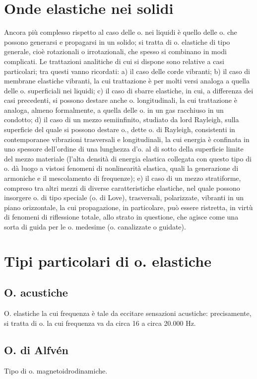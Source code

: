\documentclass[a4paper]{article}
\begin{document}
\section{Onde elastiche nei solidi}
Ancora più complesso rispetto al caso delle o. nei liquidi è quello delle o. che possono generarsi e propagarsi in un solido; si tratta di o. elastiche di tipo generale, cioè rotazionali o irrotazionali, che spesso si combinano in modi complicati. Le trattazioni analitiche di cui si dispone sono relative a casi particolari; tra questi vanno ricordati: a) il caso delle corde vibranti; b) il caso di membrane elastiche vibranti, la cui trattazione è per molti versi analoga a quella delle o. superficiali nei liquidi; c) il caso di sbarre elastiche, in cui, a differenza dei casi precedenti, si possono destare anche o. longitudinali, la cui trattazione è analoga, almeno formalmente, a quella delle o. in un gas racchiuso in un condotto; d) il caso di un mezzo semiinfinito, studiato da lord Rayleigh, sulla superficie del quale si possono destare o., dette o. di Rayleigh, consistenti in contemporanee vibrazioni trasversali e longitudinali, la cui energia è confinata in uno spessore dell’ordine di una lunghezza d’o. al di sotto della superficie limite del mezzo materiale (l’alta densità di energia elastica collegata con questo tipo di o. dà luogo a vistosi fenomeni di nonlinearità elastica, quali la generazione di armoniche e il mescolamento di frequenze); e) il caso di un mezzo stratiforme, compreso tra altri mezzi di diverse caratteristiche elastiche, nel quale possono insorgere o. di tipo speciale (o. di Love), trasversali, polarizzate, vibranti in un piano orizzontale, la cui propagazione, in particolare, può essere ristretta, in virtù di fenomeni di riflessione totale, allo strato in questione, che agisce come una sorta di guida per le o. medesime (o. canalizzate o guidate). 

\section{Tipi particolari di o. elastiche}

\subsection{O. acustiche}
O. elastiche la cui frequenza è tale da eccitare sensazioni acustiche: precisamente, si tratta di o. la cui frequenza va da circa 16 a circa 20.000 Hz. 

\subsection{O. di Alfvén} 
Tipo di o. magnetoidrodinamiche. 
\end{document}
